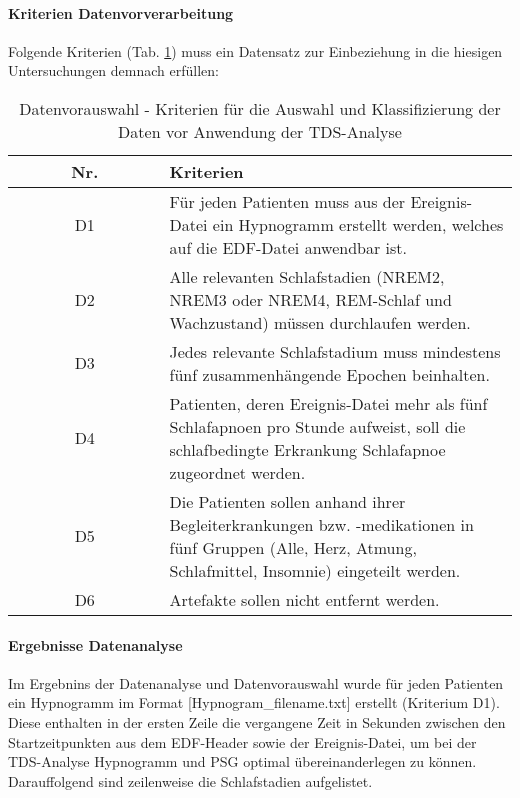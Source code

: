 \paragraph{Kriterien Datenvorverarbeitung} Folgende Kriterien (Tab. \ref{tab:Datenvorauswahl}) muss ein Datensatz zur Einbeziehung in die hiesigen Untersuchungen demnach erfüllen:

\begin{table}[H] 
\begin{tabularx}{\textwidth}{cX}
\toprule
\multicolumn{1}{c}{\textbf{~~~~~~Nr.~~~~~~}} & \multicolumn{1}{l}{\textbf{Kriterien}}\\
\midrule 
D1 & Für jeden Patienten muss aus der Ereignis-Datei ein Hypnogramm erstellt werden, welches auf die \acs{EDF}-Datei anwendbar ist.\\
D2 & Alle relevanten Schlafstadien (\acs{NREM}2, \acs{NREM}3 oder \acs{NREM}4, \acs{REM}-Schlaf und Wachzustand) müssen durchlaufen werden.\\
D3 & Jedes relevante Schlafstadium muss mindestens fünf zusammenhängende Epochen beinhalten.\\
D4 & Patienten, deren Ereignis-Datei mehr als fünf Schlafapnoen pro Stunde aufweist, soll die schlafbedingte Erkrankung Schlafapnoe zugeordnet werden.\\
D5 & Die Patienten sollen anhand ihrer Begleiterkrankungen bzw. -medikationen in fünf Gruppen (Alle, Herz, Atmung, Schlafmittel, Insomnie) eingeteilt werden.\\
D6 & Artefakte sollen nicht entfernt werden.\\
\bottomrule
\end{tabularx}
\caption[Datenvorauswahl - Kriterien]{Datenvorauswahl - Kriterien für die Auswahl und Klassifizierung der Daten vor Anwendung der \acs{TDS}-Analyse}
\label{tab:Datenvorauswahl}
\end{table}

\paragraph{Ergebnisse Datenanalyse} Im Ergebnins der Datenanalyse und Datenvorauswahl wurde für jeden Patienten ein Hypnogramm im Format [Hypnogram\_filename.txt] erstellt (Kriterium D1). Diese enthalten in der ersten Zeile die vergangene Zeit in Sekunden zwischen den Startzeitpunkten aus dem \acs{EDF}-Header sowie der Ereignis-Datei, um bei der \acs{TDS}-Analyse Hypnogramm und \acs{PSG} optimal übereinanderlegen zu können. Darauffolgend sind zeilenweise die Schlafstadien aufgelistet.\\

